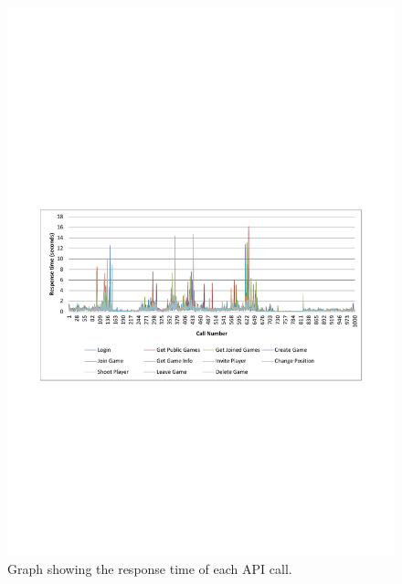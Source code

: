 \begin{figure}[H]
  \centering
  \includegraphics[width=\textwidth, clip=true, trim=0 22em 0 22em]{billeder/loadgraph.pdf}  
  \caption{Graph showing the response time of each API call.}
  \label{fig:loadgraph}
\end{figure}

